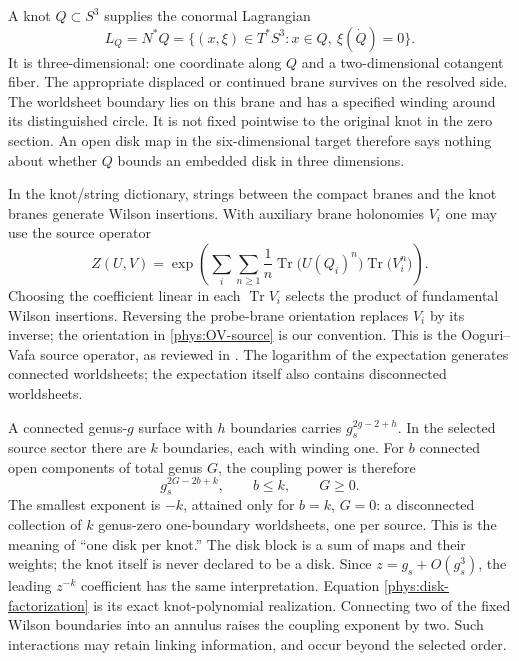 \documentclass[11pt,letterpaper]{article}
\numberwithin{equation}{section}
\theoremstyle{definition}
\theoremstyle{remark}
\begin{document}
A knot $Q\subset S^3$ supplies the conormal Lagrangian
\begin{equation}
 L_Q=N^*Q
 =\{(x,\xi)\in T^*S^3:x\in Q,\ \xi(\dot Q)=0\}.
 \label{phys:conormal}
\end{equation}
It is three-dimensional: one coordinate along $Q$ and a
two-dimensional cotangent fiber. The appropriate displaced or continued
brane survives on the resolved side. The worldsheet boundary lies on
this brane and has a specified winding around its distinguished circle.
It is not fixed pointwise to the original knot in the zero section.
An open disk map in the six-dimensional target therefore says nothing
about whether $Q$ bounds an embedded disk in three dimensions.

In the knot/string dictionary, strings between the compact branes and
the knot branes generate Wilson insertions. With auxiliary brane
holonomies $V_i$ one may use the source operator
\begin{equation}
 Z(U,V)=\exp\!\left(
  \sum_i\sum_{n\ge1}\frac{1}{n}
  \operatorname{Tr}\bigl(U(Q_i)^n\bigr)
  \operatorname{Tr}\bigl(V_i^n\bigr)\right).
 \label{phys:OV-source}
\end{equation}
Choosing the coefficient linear in each $\operatorname{Tr}V_i$
selects the product of fundamental Wilson insertions. Reversing the
probe-brane orientation replaces $V_i$ by its inverse; the orientation
in \eqref{phys:OV-source} is our convention. This is the
Ooguri--Vafa source operator, as reviewed in \cite[Eq.~(2.6)]{LMV}.
The logarithm of the expectation generates connected worldsheets;
the expectation itself also contains disconnected worldsheets.

A connected genus-$g$ surface with $h$ boundaries carries
$g_s^{2g-2+h}$. In the selected source sector there are $k$ boundaries,
each with winding one. For $b$ connected open components of total genus
$G$, the coupling power is therefore
\begin{equation}
 g_s^{2G-2b+k},\qquad b\le k,\qquad G\ge0.
 \label{phys:worldsheet-power}
\end{equation}
The smallest exponent is $-k$, attained only for $b=k$, $G=0$: a
disconnected collection of $k$ genus-zero one-boundary worldsheets,
one per source. This is the meaning of ``one disk per knot.'' The disk
block is a sum of maps and their weights; the knot itself is never
declared to be a disk. Since $z=g_s+O(g_s^3)$, the leading $z^{-k}$
coefficient has the same interpretation. Equation
\eqref{phys:disk-factorization} is its exact knot-polynomial
realization. Connecting two of the fixed Wilson boundaries into an
annulus raises the coupling exponent by two. Such interactions may
retain linking information, and occur beyond the selected order.
\end{document}

